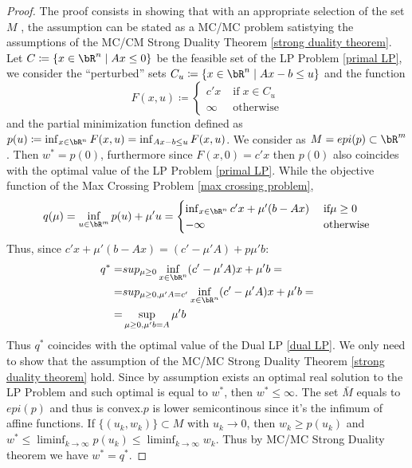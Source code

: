 \documentclass[11pt,a4paper,oneside,openany]{book}
\numberwithin{definition}{section}
\numberwithin{theorem}{section}
\numberwithin{problem}{section}
\begin{document}
\begin{proof}
    The proof consists in showing that with an appropriate selection of the
set \(M\) , the assumption can be stated as a MC/MC problem satistying the assumptions of
the MC/CM Strong Duality Theorem \ref{strong duality theorem}. Let $C \coloneqq \{x \in \bR^n \mid Ax \leq 0\}$ be the feasible set of the LP Problem \ref{primal LP}, we consider the ``perturbed'' sets $C_u \coloneqq \{ x \in \bR^n \mid Ax - b \leq u\}$ and the function \begin{equation}
    F(x,u) \coloneqq \begin{cases}
        c'x \;& \text{if} \; x \in C_u \\
        \infty & \text{otherwise}
    \end{cases}
\end{equation}
and the partial minimization function defined as $p(u) \coloneqq \inf_{x \in \bR^n}F(x,u) = \inf_{Ax - b \leq u}F(x,u)  $. We consider as $M = epi(p) \subset \bR^m$. Then $w^* = p(0)$, furthermore since $F(x,0) = c'x$ then $p(0)$ also coincides with the optimal value of the LP Problem \ref{primal LP}. While the objective function of the Max Crossing Problem \ref{max crossing problem}, \[q(\mu) = \inf_{u \in \bR^m}p(u) + \mu' u = \begin{cases}
     \inf_{x \in \bR^n}c'x + \mu' (b-Ax) \; & \text{if} \mu \geq 0 \\
     -\infty & \text{otherwise}
\end{cases} \]
Thus, since $c'x + \mu' (b-Ax) = (c' - \mu' A)+ p \mu'b$:
\begin{align}   
    q^* = &sup_{\mu \geq 0} \inf_{x \in \bR^n} (c' - \mu' A)x + \mu'b= \\
    = &sup_{\mu \geq 0, \mu'A = c'} \inf_{x \in \bR^n} (c' - \mu' A)x + \mu'b = \\
    = & \sup_{\mu \geq 0, \mu'b = A} \mu'b
\end{align}
Thus $q^*$ coincides with the optimal value of the Dual LP \ref{dual LP}. We only need to show that the assumption of the MC/MC Strong Duality Theorem \ref{strong duality theorem} hold. Since by assumption exists an optimal real solution to the LP Problem and such optimal is equal to \(w^*\), then $w^* \leq \infty$. The set $\bar M$ equals to \(epi(p)\) and thus is convex.$p$ is lower semicontinous since it's the infimum of affine functions. If \(\{(u_k,w_k)\} \subset M\) with \(u_k \to 0\), then \( w_k \geq p(u_k)\) and $w^* \leq \liminf_{k \to \infty}p(u_k)  \leq \liminf_{k \to \infty}w_k$. 
Thus by MC/MC Strong Duality theorem we have $w^* = q^*$.
\end{proof}
\end{document}
